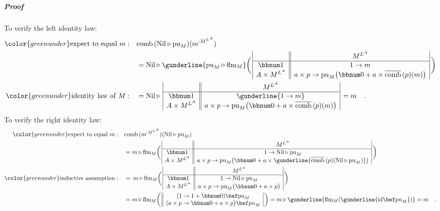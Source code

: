 \subparagraph{Proof}

To verify the left identity law:
\begin{align*}
{\color{greenunder}\text{expect to equal }m:}\quad & \text{comb}\,(\text{Nil}\triangleright\text{pu}_{M})(m^{:M^{L^{A}}})\\
 & =\text{Nil}\triangleright\gunderline{\text{pu}_{M}\triangleright\text{flm}_{M}}\bigg(\,\begin{array}{|c||c|}
 & M^{L^{A}}\\
\hline \bbnum 1 & 1\rightarrow m\\
A\times M^{L^{A}} & a\times p\rightarrow\text{pu}_{M}\big(\bbnum 0+a\times\overline{\text{comb}}\,(p)(m)\big)
\end{array}\,\bigg)\\
{\color{greenunder}\text{identity law of }M:}\quad & =\text{Nil}\triangleright\,\begin{array}{|c||c|}
 & M^{L^{A}}\\
\hline \bbnum 1 & \gunderline{1\rightarrow m}\\
A\times M^{L^{A}} & a\times p\rightarrow\text{pu}_{M}\big(\bbnum 0+a\times\overline{\text{comb}}\,(p)(m)\big)
\end{array}\,=m\quad.
\end{align*}
To verify the right identity law:
\begin{align*}
{\color{greenunder}\text{expect to equal }m:}\quad & \text{comb}\,(m^{:M^{L^{A}}})(\text{Nil}\triangleright\text{pu}_{M})\\
 & =m\triangleright\text{flm}_{M}\bigg(\,\begin{array}{|c||c|}
 & M^{L^{A}}\\
\hline \bbnum 1 & 1\rightarrow\text{Nil}\triangleright\text{pu}_{M}\\
A\times M^{L^{A}} & a\times p\rightarrow\text{pu}_{M}\big(\bbnum 0+a\times\gunderline{\overline{\text{comb}}\,(p)(\text{Nil}\triangleright\text{pu}_{M})}\big)
\end{array}\,\bigg)\\
{\color{greenunder}\text{inductive assumption}:}\quad & =\,m\triangleright\text{flm}_{M}\bigg(\,\begin{array}{|c||c|}
 & M^{L^{A}}\\
\hline \bbnum 1 & 1\rightarrow\text{Nil}\triangleright\text{pu}_{M}\\
A\times M^{L^{A}} & a\times p\rightarrow\text{pu}_{M}\big(\bbnum 0+a\times p\big)
\end{array}\,\bigg)\\
 & =m\triangleright\text{flm}_{M}\bigg(\,\begin{array}{||c|}
(1\rightarrow1+\bbnum 0)\bef\text{pu}_{M}\\
(a\times p\rightarrow\bbnum 0+a\times p\big)\bef\text{pu}_{M}
\end{array}\,\bigg)=m\triangleright\gunderline{\text{flm}_{M}(\gunderline{\text{id}\bef\text{pu}_{M}})}=m\quad.
\end{align*}
